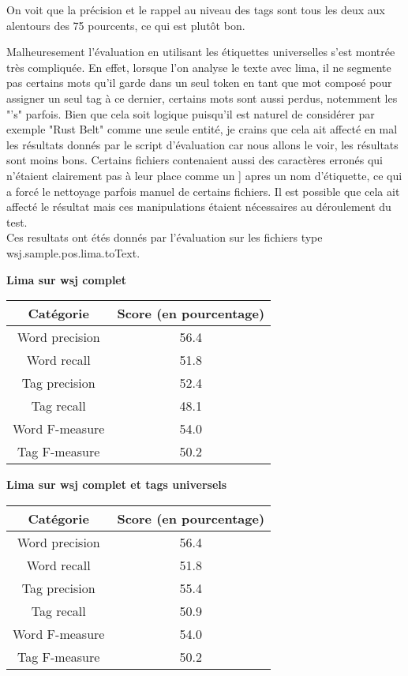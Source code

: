 \documentclass[12pt]{report}
\begin{document}
On voit que la précision et le rappel au niveau des tags sont tous les deux aux alentours des 75 pourcents, ce qui est plutôt bon.

Malheuresement l'évaluation en utilisant les étiquettes universelles s'est montrée très compliquée. En effet, lorsque l'on analyse le texte avec lima, il ne segmente pas certains mots qu'il garde dans un seul token en tant que mot composé pour assigner un seul tag à ce dernier, certains mots sont aussi perdus, notemment les "'s" parfois. Bien que cela soit logique puisqu'il est naturel de considérer par exemple "Rust Belt" comme une seule entité, je crains que cela ait affecté en mal les résultats donnés par le script d'évaluation car nous allons le voir, les résultats sont moins bons. Certains fichiers contenaient aussi des caractères erronés qui n'étaient clairement pas à leur place comme un ] apres un nom d'étiquette, ce qui a forcé le nettoyage parfois manuel de certains fichiers. Il est possible que cela ait affecté le résultat mais ces manipulations étaient nécessaires au déroulement du test. \\ 
Ces resultats ont étés donnés par l'évaluation sur les fichiers type wsj.sample.pos.lima.toText.


\textbf{Lima sur wsj complet}

\begin{tabular}{c c}
\hline
  Catégorie & Score (en pourcentage) \\
\hline
    Word precision & 56.4 \\
    Word recall & 51.8 \\
    Tag precision & 52.4 \\
    Tag recall & 48.1 \\
    Word F-measure & 54.0 \\
    Tag F-measure & 50.2 \\
    
\end{tabular}

\vspace{15mm}
\textbf{Lima sur wsj complet et tags universels}

\begin{tabular}{c c}
\hline
  Catégorie & Score (en pourcentage) \\
\hline
    Word precision & 56.4 \\
    Word recall &  51.8 \\
    Tag precision & 55.4 \\
    Tag recall & 50.9 \\
    Word F-measure & 54.0 \\
    Tag F-measure &  50.2 \\
    
\end{tabular}
\end{document}
